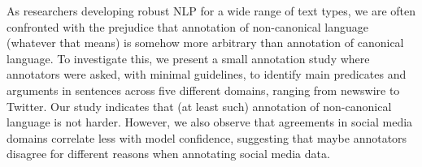 As researchers developing robust NLP for a wide range of text types, we are often confronted with the prejudice that annotation of non-canonical language (whatever that means) is somehow more arbitrary than annotation of canonical language. To investigate this, we present a small annotation study where annotators were asked, with minimal guidelines, to identify main predicates and arguments in sentences across five different domains, ranging from newswire to Twitter. Our study indicates that (at least such) annotation of non-canonical language is not harder. However, we also observe that agreements in social media domains correlate less with model confidence, suggesting that maybe annotators disagree for different reasons when annotating social media data.
